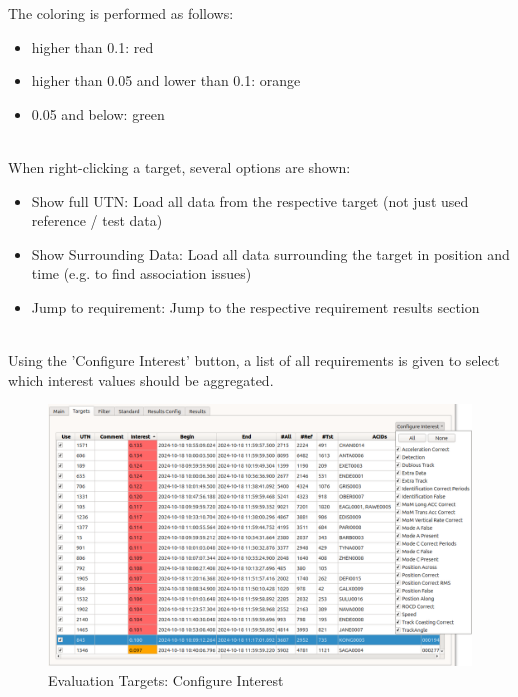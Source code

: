 The coloring is performed as follows:
\begin{itemize}  
\item higher than 0.1: red
\item higher than 0.05 and lower than 0.1: orange
\item 0.05 and below: green
\end{itemize}
\ \\

When right-clicking a target, several options are shown:
\begin{itemize}  
\item Show full UTN: Load all data from the respective target (not just used reference / test data)
\item Show Surrounding Data: Load all data surrounding the target in position and time (e.g. to find association issues)
\item Jump to requirement: Jump to the respective requirement results section
\end{itemize}
\ \\

Using the 'Configure Interest' button, a list of all requirements is given to select which interest values should be aggregated.
\begin{figure}[H]
  \hspace*{-2.5cm}
    \includegraphics[width=19cm,frame]{figures/eval_targets_config_interest.png}
  \caption{Evaluation Targets: Configure Interest}
\end{figure}

